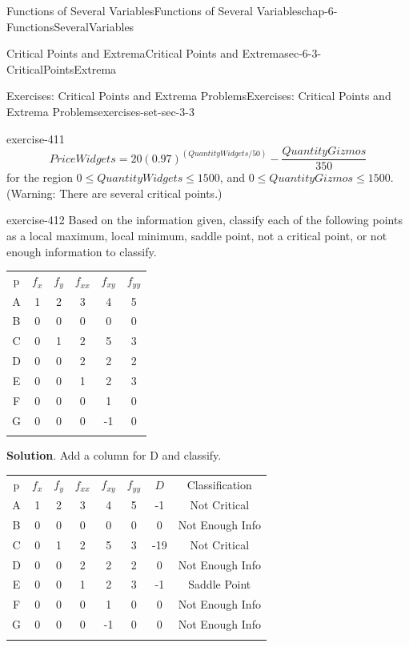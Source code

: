 \documentclass[oneside,10pt,]{book}
\numberwithin{equation}{section}
\newcommand{\hrulethin}  {\noalign{\hrule height 0.04em}}
\newcommand{\hrulethick} {\noalign{\hrule height 0.11em}}
\begin{document}
\begin{chapterptx}{Functions of Several Variables}{}{Functions of Several Variables}{}{}{chap-6-FunctionsSeveralVariables}
\begin{sectionptx}{Critical Points and Extrema}{}{Critical Points and Extrema}{}{}{sec-6-3-CriticalPointsExtrema}
\begin{exercises-subsection-numberless}{Exercises: Critical Points and Extrema Problems}{}{Exercises: Critical Points and Extrema Problems}{}{}{exercises-set-sec-3-3}
\begin{divisionexercise}{6}{}{}{exercise-411}
\begin{equation*}
\end{equation*}
%
\begin{equation*}
PriceWidgets=20(0.97)^{(QuantityWidgets/50) }-\frac{QuantityGizmos}{350}
\end{equation*}
\hypertarget{p-2420}{}%
for the region \(0\le QuantityWidgets\le 1500\), and \(0\le QuantityGizmos\le 1500\).  (Warning: There are several critical points.)%
\end{divisionexercise}%
\begin{divisionexercise}{7}{}{}{exercise-412}%
\hypertarget{p-2421}{}%
Based on the information given, classify each of the following points as a local maximum, local minimum, saddle point, not a critical point, or not enough information to classify.%
\begin{sidebyside}{1}{0}{0}{0}%
\begin{sbspanel}{1}%
{\centering%
\begin{tabular}{cccccc}\hrulethick
p&\(f_x\)&\(f_y\)&\(f_{xx}\)&\(f_{xy}\)&\(f_{yy}\)\tabularnewline\hrulethin
A&1&2&3&4&5\tabularnewline\hrulethin
B&0&0&0&0&0\tabularnewline\hrulethin
C&0&1&2&5&3\tabularnewline\hrulethin
D&0&0&2&2&2\tabularnewline\hrulethin
E&0&0&1&2&3\tabularnewline\hrulethin
F&0&0&0&1&0\tabularnewline\hrulethin
G&0&0&0&-1&0\tabularnewline\hrulethin
\end{tabular}
\par}
\end{sbspanel}%
\end{sidebyside}%
\par\smallskip%
\noindent\textbf{Solution}.\hypertarget{solution-208}{}\quad%
\hypertarget{p-2422}{}%
Add a column for D and classify.%
\begin{sidebyside}{1}{0}{0}{0}%
\begin{sbspanel}{1}%
{\centering%
\begin{tabular}{cccccccc}\hrulethick
p&\(f_x\)&\(f_y\)&\(f_{xx}\)&\(f_{xy}\)&\(f_{yy}\)&\(D\)&Classification\tabularnewline\hrulethin
A&1&2&3&4&5&-1&Not Critical\tabularnewline\hrulethin
B&0&0&0&0&0&0&Not Enough Info\tabularnewline\hrulethin
C&0&1&2&5&3&-19&Not Critical\tabularnewline\hrulethin
D&0&0&2&2&2&0&Not Enough Info\tabularnewline\hrulethin
E&0&0&1&2&3&-1&Saddle Point\tabularnewline\hrulethin
F&0&0&0&1&0&0&Not Enough Info\tabularnewline\hrulethin
G&0&0&0&-1&0&0&Not Enough Info\tabularnewline\hrulethin
\end{tabular}
\par}
\end{sbspanel}%
\end{sidebyside}%

\end{divisionexercise}
\end{exercises-subsection-numberless}
\end{sectionptx}
\end{chapterptx}
\end{document}
